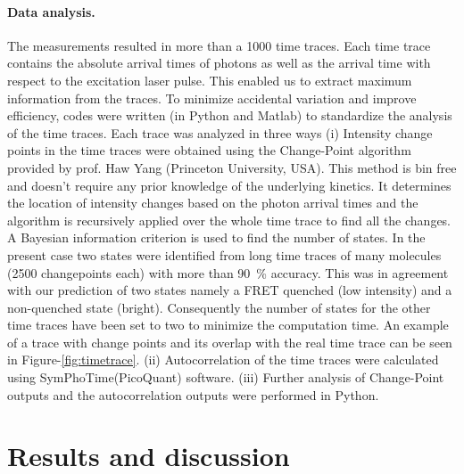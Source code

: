\documentclass[journal=jacsat,manuscript=article]{achemso}
\begin{document}
\paragraph*{Data analysis.}
The measurements resulted in more than a 1000 time traces.
Each time trace contains the absolute arrival times of photons as well as the arrival time with respect to the excitation laser pulse.
This enabled us to extract maximum information from the traces.
To minimize accidental variation and improve efficiency, codes were written (in Python and Matlab) to standardize the analysis of the time traces.
Each trace was analyzed in three ways (i) Intensity change points in the time traces were obtained using the Change-Point algorithm\cite{watkins2005detection} provided by prof. Haw Yang 
(Princeton University, USA).
This method is bin free and doesn't require any prior knowledge of the underlying kinetics.
It determines the location of intensity changes based on the photon arrival times and the algorithm is recursively applied over the whole time trace to find all the changes.
A Bayesian information criterion is used to find the number of states.
In the present case two states were identified from long time traces of many molecules (2500 changepoints each) with more than \SI{90}{\percent} accuracy.
This was in agreement with our prediction of two states namely a FRET quenched (low intensity) and a non-quenched state (bright).
Consequently the number of states for the other time traces have been set to two to minimize the computation time.
An example of a trace with change points and its overlap with the real time trace can be seen in Figure-\ref{fig:timetrace}.
(ii) Autocorrelation of the time traces were calculated using SymPhoTime(PicoQuant) software.
(iii) Further analysis of Change-Point outputs and the autocorrelation outputs were performed in Python.

\section{Results and discussion\label{sec:results}}
\end{document}
